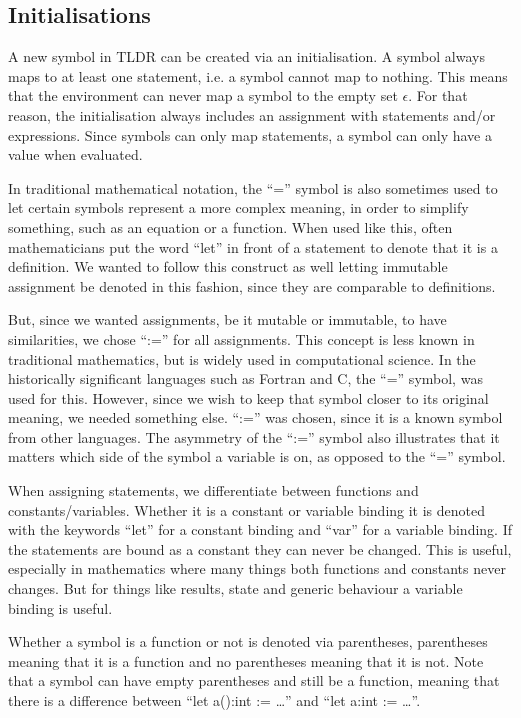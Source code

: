 \subsection{Initialisations}\label{subsec:initialisations}
A new symbol in TLDR can be created via an initialisation. A symbol always maps to at least one statement, i.e. a symbol cannot map to nothing. This means that the environment can never map a symbol to the empty set $\epsilon$. For that reason, the initialisation always includes an assignment with statements and/or expressions. Since symbols can only map statements, a symbol can only have a value when evaluated.

In traditional mathematical notation, the \enquote{=} symbol is also sometimes used to let certain symbols represent a more complex meaning, in order to simplify something, such as an equation or a function. When used like this, often mathematicians put the word \enquote{let} in front of a statement to denote that it is a definition. We wanted to follow this construct as well letting immutable assignment be denoted in this fashion, since they are comparable to definitions. 

But, since we wanted assignments, be it mutable or immutable, to have similarities, we chose \enquote{:=} for all assignments. This concept is less known in traditional mathematics, but is widely used in computational science. In the historically significant languages such as Fortran and C, the \enquote{=} symbol, was used for this. However, since we wish to keep that symbol closer to its original meaning, we needed something else. \enquote{:=} was chosen, since it is a known symbol from other languages. The asymmetry of the \enquote{:=} symbol also illustrates that it matters which side of the symbol a variable is on, as opposed to the \enquote{=} symbol.

When assigning statements, we differentiate between functions and constants/variables. Whether it is a constant or variable binding it is denoted with the keywords \enquote{let} for a constant binding and \enquote{var} for a variable binding. If the statements are bound as a constant they can never be changed. This is useful, especially in mathematics where many things both functions and constants never changes. But for things like results, state and generic behaviour a variable binding is useful.

Whether a symbol is a function or not is denoted via parentheses, parentheses meaning that it is a function and no parentheses meaning that it is not. Note that a symbol can have empty parentheses and still be a function, meaning that there is a difference between \enquote{let a():int := \dots} and \enquote{let a:int := \dots}. 

